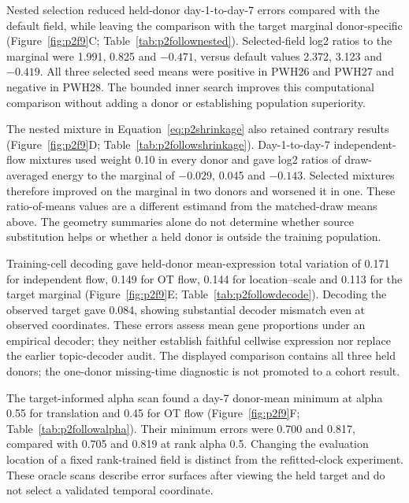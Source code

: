 \documentclass[10pt,a4paper]{article}
\begin{document}
Nested selection reduced held-donor day-1-to-day-7 errors compared with the default field, while leaving the comparison with the target marginal donor-specific (Figure~\ref{fig:p2f9}C; Table~\ref{tab:p2follownested}). Selected-field log2 ratios to the marginal were 1.991, 0.825 and $-0.471$, versus default values 2.372, 3.123 and $-0.419$. All three selected seed means were positive in PWH26 and PWH27 and negative in PWH28. The bounded inner search improves this computational comparison without adding a donor or establishing population superiority.

The nested mixture in Equation~\eqref{eq:p2shrinkage} also retained contrary results (Figure~\ref{fig:p2f9}D; Table~\ref{tab:p2followshrinkage}). Day-1-to-day-7 independent-flow mixtures used weight 0.10 in every donor and gave log2 ratios of draw-averaged energy to the marginal of $-0.029$, 0.045 and $-0.143$. Selected mixtures therefore improved on the marginal in two donors and worsened it in one. These ratio-of-means values are a different estimand from the matched-draw means above. The geometry summaries alone do not determine whether source substitution helps or whether a held donor is outside the training population.

Training-cell decoding gave held-donor mean-expression total variation of 0.171 for independent flow, 0.149 for OT flow, 0.144 for location--scale and 0.113 for the target marginal (Figure~\ref{fig:p2f9}E; Table~\ref{tab:p2followdecode}). Decoding the observed target gave 0.084, showing substantial decoder mismatch even at observed coordinates. These errors assess mean gene proportions under an empirical decoder; they neither establish faithful cellwise expression nor replace the earlier topic-decoder audit. The displayed comparison contains all three held donors; the one-donor missing-time diagnostic is not promoted to a cohort result.

The target-informed alpha scan found a day-7 donor-mean minimum at alpha 0.55 for translation and 0.45 for OT flow (Figure~\ref{fig:p2f9}F; Table~\ref{tab:p2followalpha}). Their minimum errors were 0.700 and 0.817, compared with 0.705 and 0.819 at rank alpha 0.5. Changing the evaluation location of a fixed rank-trained field is distinct from the refitted-clock experiment. These oracle scans describe error surfaces after viewing the held target and do not select a validated temporal coordinate.

\end{document}
